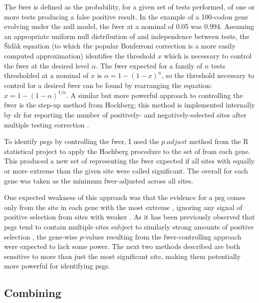 The \ac{fwer} is defined as the probability, for a given set of tests
performed, of one or more tests producing a false positive result. In
the example of a 100-codon gene evolving under the null model, the
\ac{fwer} at a nominal \pv of 0.05 was 0.994. Assuming an
appropriate uniform null distribution of \pvs and independence
between tests, the \v{S}id\`{a}k equation (to which the popular
Bonferroni correction is a more easily computed approximation)
identifies the \pv threshold $x$ which is necessary to control the
\ac{fwer} at the desired level $\alpha$. The \ac{fwer} expected for a
family of $n$ tests thresholded at a nominal \pv of $x$ is
$\alpha=1 - (1 - x)^{n}$, so the \pv threshold necessary to
control for a desired \ac{fwer} can be found by rearranging the
equation: $x=1 - (1 - \alpha)^{1/n}$. A similar but more powerful
approach to controlling the \ac{fwer} is the step-up method from
Hochberg; this method is implemented internally by \ac{slr} for
reporting the number of positively- and negatively-selected sites
after multiple testing correction \citep{Hochberg1988,Massingham2005}.

To identify \acp{psg} by controlling the \ac{fwer}, I used the
$p.adjust$ method from the R statistical project to apply the Hochberg
procedure to the set of \sw \pvs from each gene. This produced a
new set of \pvs representing the \ac{fwer} expected if all sites
with \pvs equally or more extreme than the given site were called
significant. The overall \pv for each gene was taken as the
minimum \ac{fwer}-adjusted \pv across all sites.

One expected weakness of this approach was that the evidence for a
\ac{psg} comes only from the site in each gene with the most extreme
\slrt, ignoring any signal of positive selection from sites with
weaker \pvs. As it has been previously observed that \acp{psg}
tend to contain multiple sites subject to similarly strong amounts of
positive selection \citep{Sawyer2005a,Kosiol2008}, the gene-wise
$p$-values resulting from the \ac{fwer}-controlling approach were
expected to lack some power. The next two methods described are both
sensitive to more than just the most significant site, making them
potentially more powerful for identifying \acp{psg}.

\subsection{Combining \pvs}

